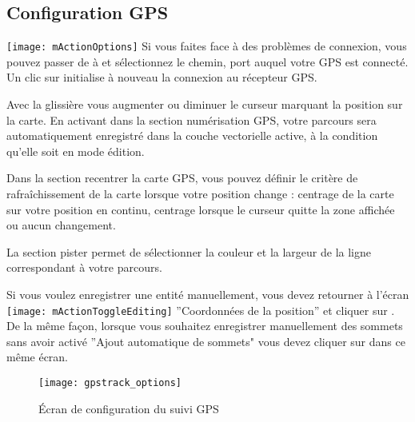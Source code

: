 \subsection{Configuration GPS}
\texttt{[image: mActionOptions]} Si vous faites face à des problèmes de connexion, vous pouvez passer de  à  et sélectionnez le chemin, port auquel votre GPS est connecté. 
Un clic sur  initialise à nouveau la connexion au récepteur GPS.

Avec la glissière  vous augmenter ou diminuer le curseur marquant la position sur la carte. En activant  dans la section numérisation GPS, votre parcours sera automatiquement enregistré dans la couche vectorielle active, à la condition qu'elle soit en mode édition. 

Dans la section recentrer la carte GPS, vous pouvez définir le critère de rafraîchissement de la carte lorsque votre position change : centrage de la carte sur votre position en continu, centrage lorsque le curseur quitte la zone affichée ou aucun changement. 

La section pister permet de sélectionner la couleur et la largeur de la ligne correspondant à votre parcours.

Si vous voulez enregistrer une entité manuellement, vous devez retourner à l'écran \texttt{[image: mActionToggleEditing]} ''Coordonnées de la position'' et cliquer sur . De la même façon, lorsque vous souhaitez enregistrer manuellement des sommets sans avoir activé ''Ajout automatique de sommets"  vous devez cliquer sur  dans ce même écran.

\begin{figure}[ht]
   \centering
   \texttt{[image: gpstrack\_options]}
   \caption{Écran de configuration du suivi GPS \nixcaption}
   \label{fig:gpstrack_options}
\end{figure}

\FloatBarrier
